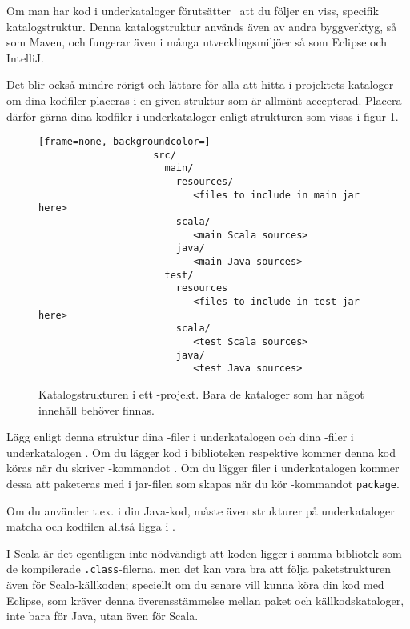 Om man har kod i underkataloger förutsätter \sbt\ att du följer en viss, specifik katalogstruktur. Denna katalogstruktur används även av andra byggverktyg, så som Maven, och fungerar även i många utvecklingsmiljöer så som Eclipse och IntelliJ.

Det blir också mindre rörigt och lättare för alla att hitta i projektets kataloger om dina kodfiler placeras i en given struktur som är allmänt accepterad.
Placera därför gärna dina kodfiler i underkataloger enligt strukturen som visas i figur \ref{fig:sbt:dir-structure}.

\begin{figure}[H]
\centering

\begin{lstlisting}[frame=none, backgroundcolor=]
					src/
					  main/
					    resources/
					       <files to include in main jar here>
					    scala/
					       <main Scala sources>
					    java/
					       <main Java sources>
					  test/
					    resources
					       <files to include in test jar here>
					    scala/
					       <test Scala sources>
					    java/
					       <test Java sources>
\end{lstlisting}

\caption{Katalogstrukturen i ett \sbt-projekt. Bara de kataloger som har något innehåll behöver finnas.}
\label{fig:sbt:dir-structure}
\end{figure}

\noindent Lägg enligt denna struktur dina -filer i underkatalogen  och dina -filer i underkatalogen . Om du lägger kod i biblioteken   respektive  kommer denna kod köras när du skriver \sbt-kommandot . Om du lägger filer i underkatalogen  kommer dessa att paketeras med i jar-filen som skapas när du kör \sbt-kommandot \texttt{package}.

Om du använder t.ex.  i din Java-kod, måste även strukturer på underkataloger matcha och kodfilen alltså ligga i  .

I Scala är det egentligen inte nödvändigt att koden ligger i samma bibliotek som de kompilerade \texttt{.class}-filerna, men det kan vara bra att följa paketstrukturen även för Scala-källkoden; speciellt om du senare vill kunna köra din kod med Eclipse, som kräver denna överensstämmelse mellan paket och källkodskataloger, inte bara för Java, utan även för Scala.


